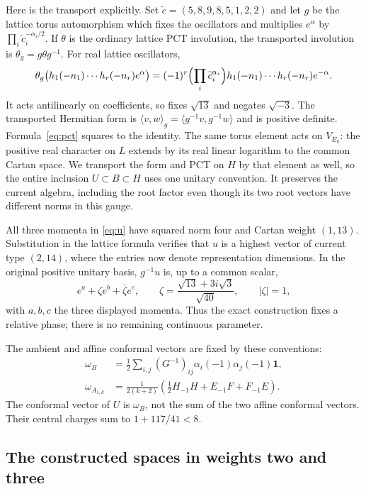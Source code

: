 \documentclass[11pt,a4paper]{article}
\theoremstyle{definition}
\newcommand{\one}{\mathbf1}
\begin{document}
Here is the transport explicitly. Set
$\widetilde c=(5,8,9,8,5,1,2,2)$ and let $g$ be the lattice torus
automorphism which fixes the oscillators and multiplies $e^\alpha$ by
$\prod_i\widetilde c_i^{-\alpha_i/2}$. If $\theta$ is the ordinary
lattice PCT involution, the transported involution is
$\theta_g=g\theta g^{-1}$. For real lattice oscillators,
\begin{equation}\label{eq:pct}
 \theta_g\bigl(h_1(-n_1)\cdots h_r(-n_r)e^\alpha\bigr)
 =(-1)^r\Bigl(\prod_i\widetilde c_i^{\alpha_i}\Bigr)
       h_1(-n_1)\cdots h_r(-n_r)e^{-\alpha}.
\end{equation}
It acts antilinearly on coefficients, so fixes $\sqrt{13}$ and
negates $\sqrt{-3}$. The transported Hermitian form is
$\langle v,w\rangle_g=\langle g^{-1}v,g^{-1}w\rangle$ and is
positive definite. Formula~\eqref{eq:pct} squares to the identity.
The same torus element acts on $V_{E_8}$: the positive real character
on $L$ extends by its real linear logarithm to the common Cartan space.
We transport the form and PCT on $H$ by that element as well, so the
entire inclusion $U\subset B\subset H$ uses one unitary convention.
It preserves the current algebra, including the root factor even
though its two root vectors have different norms in this gauge.

All three momenta in \eqref{eq:u} have squared norm four and Cartan
weight $(1,13)$. Substitution in the lattice formula verifies that
$u$ is a highest vector of current type $(2,14)$, where the entries
now denote representation dimensions. In the original positive unitary
basis, $g^{-1}u$ is, up to a common scalar,
\[
 e^a+\zeta e^b+\overline\zeta e^c,\qquad
 \zeta=\frac{\sqrt{13}+3i\sqrt3}{\sqrt{40}},\qquad |\zeta|=1,
\]
with $a,b,c$ the three displayed momenta. Thus the exact construction
fixes a relative phase; there is no remaining continuous parameter.

The ambient and affine conformal vectors are fixed by these conventions:
\begin{align}
 \omega_B&=\frac12\sum_{i,j}(G^{-1})_{ij}
               \alpha_i(-1)\alpha_j(-1)\one,\label{eq:ambient-stress}\\
 \omega_{A_{1,k}}&=\frac{1}{2(k+2)}
       \left(\tfrac12 H_{-1}H+E_{-1}F+F_{-1}E\right).
       \label{eq:sugawara}
\end{align}
The conformal vector of $U$ is $\omega_B$, not the sum of the two
affine conformal vectors. Their central charges sum to
$1+117/41<8$.

\subsection{The constructed spaces in weights two and three}
\end{document}
